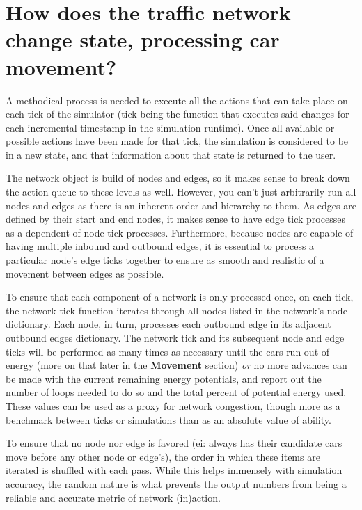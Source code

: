 
\section{How does the traffic network change state, processing car movement?}

\par A methodical process is needed to execute all the actions that can take place on each tick of the simulator (tick being the function that executes said changes for each incremental timestamp in the simulation runtime).  Once all available or possible actions have been made for that tick, the simulation is considered to be in a new state, and that information about that state is returned to the user. \\

\par The network object is build of nodes and edges, so it makes sense to break down the action queue to these levels as well.  However, you can't just arbitrarily run all nodes and edges as there is an inherent order and hierarchy to them.  As edges are defined by their start and end nodes, it makes sense to have edge tick processes as a dependent of node tick processes.  Furthermore, because nodes are capable of having multiple inbound and outbound edges, it is essential to process a particular node's edge ticks together to ensure as smooth and realistic of a movement between edges as possible. \\

\par To ensure that each component of a network is only processed once, on each tick, the network tick function iterates through all nodes listed in the network's node dictionary.  Each node, in turn, processes each outbound edge in its adjacent outbound edges dictionary.  The network tick and its subsequent node and edge ticks will be performed as many times as necessary until the cars run out of energy (more on that later in the \textbf{Movement} section) \textit{or} no more advances can be made with the current remaining energy potentials, and report out the number of loops needed to do so and the total percent of potential energy used.  These values can be used as a proxy for network congestion, though more as a benchmark between ticks or simulations than as an absolute value of ability. \\

\par To ensure that no node nor edge is favored (ei: always has their candidate cars move before any other node or edge's), the order in which these items are iterated is shuffled with each pass.  While this helps immensely with simulation accuracy, the random nature is what prevents the output numbers from being a reliable and accurate metric of network (in)action. 


